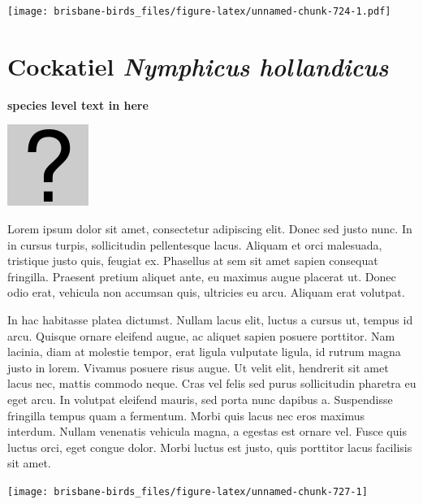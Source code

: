 \documentclass[]{book}
\let\origfigure\figure
\let\endorigfigure\endfigure
\renewenvironment{figure}[1][2] {
  \expandafter\origfigure\expandafter[H]
} {
  \endorigfigure
}
\begin{document}
\begin{figure}
\centering
\texttt{[image: brisbane-birds\_files/figure-latex/unnamed-chunk-724-1.pdf]}
\caption{\label{fig:unnamed-chunk-724}insert figure caption}
\end{figure}

\section{\texorpdfstring{Cockatiel \emph{Nymphicus
hollandicus}}{Cockatiel Nymphicus hollandicus}}\label{cockatiel-nymphicus-hollandicus}

\textbf{species level text in here}

\begin{figure}
\centering
\includegraphics{assets/missing.png}
\caption{No image for species}
\end{figure}

Lorem ipsum dolor sit amet, consectetur adipiscing elit. Donec sed justo
nunc. In in cursus turpis, sollicitudin pellentesque lacus. Aliquam et
orci malesuada, tristique justo quis, feugiat ex. Phasellus at sem sit
amet sapien consequat fringilla. Praesent pretium aliquet ante, eu
maximus augue placerat ut. Donec odio erat, vehicula non accumsan quis,
ultricies eu arcu. Aliquam erat volutpat.

In hac habitasse platea dictumst. Nullam lacus elit, luctus a cursus ut,
tempus id arcu. Quisque ornare eleifend augue, ac aliquet sapien posuere
porttitor. Nam lacinia, diam at molestie tempor, erat ligula vulputate
ligula, id rutrum magna justo in lorem. Vivamus posuere risus augue. Ut
velit elit, hendrerit sit amet lacus nec, mattis commodo neque. Cras vel
felis sed purus sollicitudin pharetra eu eget arcu. In volutpat eleifend
mauris, sed porta nunc dapibus a. Suspendisse fringilla tempus quam a
fermentum. Morbi quis lacus nec eros maximus interdum. Nullam venenatis
vehicula magna, a egestas est ornare vel. Fusce quis luctus orci, eget
congue dolor. Morbi luctus est justo, quis porttitor lacus facilisis sit
amet.

\begin{figure}
\texttt{[image: brisbane-birds\_files/figure-latex/unnamed-chunk-727-1]} \caption{insert figure caption}\label{fig:unnamed-chunk-727}
\end{figure}
\end{document}
